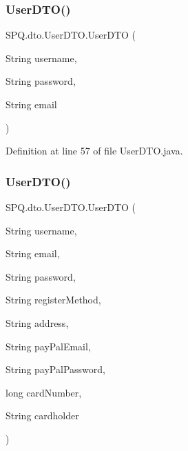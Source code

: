 \mbox{\label{class_s_p_q_1_1dto_1_1_user_d_t_o_ad7df1249da1b9fdc0b383a4b96b50eae}} 
\subsubsection{\texorpdfstring{User\+D\+T\+O()}{UserDTO()}\hspace{0.1cm}{\footnotesize\ttfamily [9/11]}}
{\footnotesize\ttfamily S\+P\+Q.\+dto.\+User\+D\+T\+O.\+User\+D\+TO (\begin{DoxyParamCaption}\item[{String}]{username,  }\item[{String}]{password,  }\item[{String}]{email }\end{DoxyParamCaption})}



Definition at line 57 of file User\+D\+T\+O.\+java.

\mbox{\label{class_s_p_q_1_1dto_1_1_user_d_t_o_ad9a6a079da473fe91114b91f0383196f}} 
\subsubsection{\texorpdfstring{User\+D\+T\+O()}{UserDTO()}\hspace{0.1cm}{\footnotesize\ttfamily [10/11]}}
{\footnotesize\ttfamily S\+P\+Q.\+dto.\+User\+D\+T\+O.\+User\+D\+TO (\begin{DoxyParamCaption}\item[{String}]{username,  }\item[{String}]{email,  }\item[{String}]{password,  }\item[{String}]{register\+Method,  }\item[{String}]{address,  }\item[{String}]{pay\+Pal\+Email,  }\item[{String}]{pay\+Pal\+Password,  }\item[{long}]{card\+Number,  }\item[{String}]{cardholder }\end{DoxyParamCaption})}



